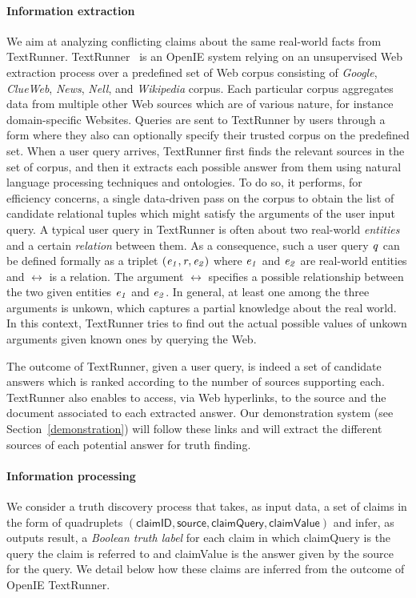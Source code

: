 \paragraph*{Information extraction} We aim at analyzing 
conflicting claims about the same real-world facts from TextRunner.
TextRunner~\cite{Yates07, Etzioni08} is an OpenIE system relying
on an unsupervised Web extraction process over a predefined 
set of Web corpus consisting of \emph{Google}, \emph{ClueWeb}, \emph{News}, \emph{Nell}, and 
\emph{Wikipedia} corpus. Each particular corpus aggregates data from multiple 
other Web sources which are of various nature, for instance domain-specific Websites.
Queries are sent to TextRunner by users through a form where 
they also can optionally specify their trusted corpus on the predefined set.
When a user query arrives, TextRunner first finds the relevant
sources in the set of corpus, and then it extracts each possible answer from them
using natural language processing techniques and ontologies. 
To do so, it performs, for efficiency concerns, a single data-driven
pass on the corpus to obtain the list of candidate relational tuples 
which might satisfy the arguments of the user input query. 
A typical user query in TextRunner is often about 
two real-world \emph{entities} and a certain \emph{relation} between them.
As a consequence, such a user query $\mathit{q}$ can be defined formally as a triplet $(\mathit{e_{1}}, \mathit{r}_{}, \mathit{e_{2}})$
where $\mathit{e_{1}}$ and $\mathit{e_{2}}$ are real-world entities and $\rel{}$ is a relation. The argument $\rel{}$ 
specifies a possible relationship between the two given entities $\mathit{e_{1}}$ and $\mathit{e_{2}}$. In general,
at least one among the three arguments is unkown, which captures a partial knowledge about the real world. 
In this context, TextRunner tries to find out the actual possible values of unkown arguments given 
known ones by querying the Web.


The outcome of TextRunner, given a user query, is indeed a set of candidate answers which is ranked according 
to the number of sources supporting each. TextRunner also enables to access, via Web hyperlinks, to the source
and the document associated to each extracted answer. Our demonstration system (see Section~\ref{demonstration})
will follow these links and will extract the different sources of each potential answer for truth finding.

\paragraph*{Information processing}
We consider a truth discovery process that takes, as input data, a set of claims 
in the form of quadruplets $(\textsf{claimID}, \textsf{source}, \textsf{claimQuery},\textsf{claimValue})$
and infer, as outputs result, a \emph{Boolean truth label} for each claim in which \textsf{claimQuery} is 
the query the claim is referred to and \textsf{claimValue} is the answer given by the source for the query. 
We detail below how these claims are inferred from the outcome of OpenIE TextRunner.

